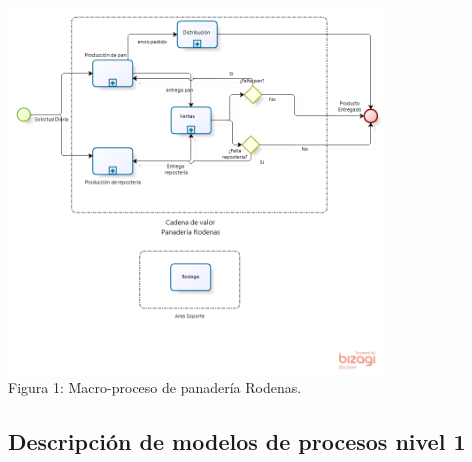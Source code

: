 \begin{center}
\includegraphics[width=10cm]{./imagenes/Macro_proceso.png}\\
Figura 1: Macro-proceso de panadería Rodenas.
\end{center}
\subsection{Descripción de modelos de procesos nivel 1} 
